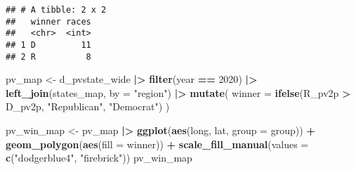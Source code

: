 \documentclass[
]{article}
\newenvironment{Shaded}{\begin{snugshade}}{\end{snugshade}}
\newcommand{\AttributeTok}[1]{\textcolor[rgb]{0.13,0.29,0.53}{#1}}
\newcommand{\CommentTok}[1]{\textcolor[rgb]{0.56,0.35,0.01}{\textit{#1}}}
\newcommand{\DecValTok}[1]{\textcolor[rgb]{0.00,0.00,0.81}{#1}}
\newcommand{\FunctionTok}[1]{\textcolor[rgb]{0.13,0.29,0.53}{\textbf{#1}}}
\newcommand{\NormalTok}[1]{#1}
\newcommand{\OtherTok}[1]{\textcolor[rgb]{0.56,0.35,0.01}{#1}}
\newcommand{\SpecialCharTok}[1]{\textcolor[rgb]{0.81,0.36,0.00}{\textbf{#1}}}
\newcommand{\StringTok}[1]{\textcolor[rgb]{0.31,0.60,0.02}{#1}}
\begin{document}
\begin{verbatim}
## # A tibble: 2 x 2
##   winner races
##   <chr>  <int>
## 1 D         11
## 2 R          8
\end{verbatim}

\begin{Shaded}
\end{Shaded}

\begin{Shaded}
\begin{Highlighting}[]
\NormalTok{pv\_map }\OtherTok{\textless{}{-}}\NormalTok{ d\_pvstate\_wide }\SpecialCharTok{|\textgreater{}}
  \FunctionTok{filter}\NormalTok{(year }\SpecialCharTok{==} \DecValTok{2020}\NormalTok{) }\SpecialCharTok{|\textgreater{}}
  \FunctionTok{left\_join}\NormalTok{(states\_map, }\AttributeTok{by =} \StringTok{"region"}\NormalTok{) }\SpecialCharTok{|\textgreater{}}
  \FunctionTok{mutate}\NormalTok{(}
    \AttributeTok{winner =} \FunctionTok{ifelse}\NormalTok{(R\_pv2p }\SpecialCharTok{\textgreater{}}\NormalTok{ D\_pv2p, }\StringTok{"Republican"}\NormalTok{, }\StringTok{"Democrat"}\NormalTok{)}
\NormalTok{  )}
\end{Highlighting}
\end{Shaded}

\begin{Shaded}
\begin{Highlighting}[]
\NormalTok{pv\_win\_map }\OtherTok{\textless{}{-}}\NormalTok{ pv\_map }\SpecialCharTok{|\textgreater{}}
  \FunctionTok{ggplot}\NormalTok{(}\FunctionTok{aes}\NormalTok{(long, lat, }\AttributeTok{group =}\NormalTok{ group)) }\SpecialCharTok{+}
  \FunctionTok{geom\_polygon}\NormalTok{(}\FunctionTok{aes}\NormalTok{(}\AttributeTok{fill =}\NormalTok{ winner)) }\SpecialCharTok{+}
  \FunctionTok{scale\_fill\_manual}\NormalTok{(}\AttributeTok{values =} \FunctionTok{c}\NormalTok{(}\StringTok{"dodgerblue4"}\NormalTok{, }\StringTok{"firebrick"}\NormalTok{))}
\NormalTok{pv\_win\_map}
\end{Highlighting}
\end{Shaded}
\end{document}
